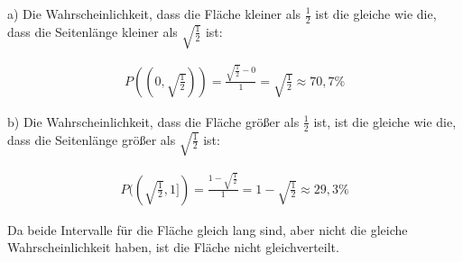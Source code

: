  a) Die Wahrscheinlichkeit, dass die Fläche kleiner als $\frac{1}{2}$ ist die gleiche wie die, dass die Seitenlänge kleiner als $\sqrt{\frac{1}{2}}$ ist:

  \begin{align*}
    P((0,\sqrt{\frac{1}{2}})) = \frac{\sqrt{\frac{1}{2}} - 0}{1} = \sqrt{\frac{1}{2}} \approx 70,7 \%
  \end{align*}

  b) Die Wahrscheinlichkeit, dass die Fläche größer als $\frac{1}{2}$ ist, ist die gleiche wie die, dass die Seitenlänge größer als $\sqrt{\frac{1}{2}}$ ist:

  \begin{align*}
    P((\sqrt{\frac{1}{2}},1]) = \frac{1 - \sqrt{\frac{1}{2}}}{1} = 1 - \sqrt{\frac{1}{2}} \approx 29,3 \%
  \end{align*}

  Da beide Intervalle für die Fläche gleich lang sind, aber nicht die gleiche Wahrscheinlichkeit haben, ist die Fläche nicht gleichverteilt.



